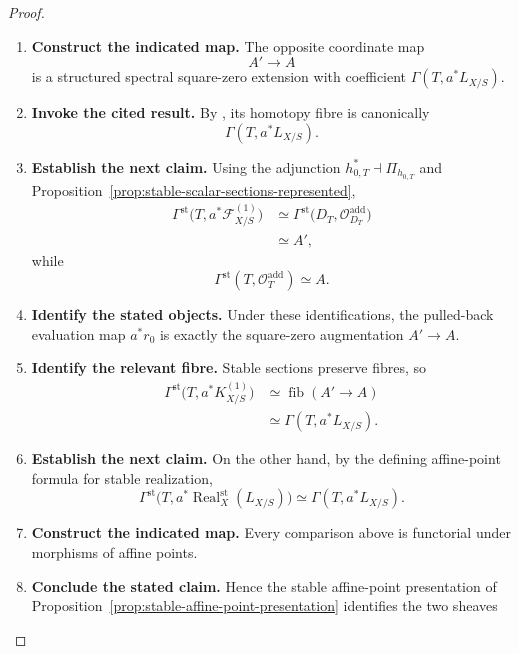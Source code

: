 \begin{proof}
\begin{enumerate}[label=\textup{(\arabic*)}]
     makes \(D_T\) affine.
    Write
    \[
    T=\Spec A,
    \qquad
    D_T=\Spec A'.
    \]
    \item \textbf{Construct the indicated map.}
    The opposite coordinate map
    \[
    A'\longrightarrow A
    \]
    is a structured spectral square-zero extension with coefficient
    \(\Gamma(T,a^*L_{X/S})\).
    \item \textbf{Invoke the cited result.}
    By
    , its homotopy fibre is canonically
    \[
    \Gamma(T,a^*L_{X/S}).
    \]
    \item \textbf{Establish the next claim.}
    Using the adjunction \(h_{0,T}^*\dashv\Pi_{h_{0,T}}\) and
    Proposition~\ref{prop:stable-scalar-sections-represented},
    \[
    \begin{aligned}
    \Gamma^{\mathrm{st}}
    \bigl(T,a^*\mathscr F^{(1)}_{X/S}\bigr)
    &\simeq
    \Gamma^{\mathrm{st}}
    \bigl(D_T,\mathcal O_{D_T}^{\mathrm{add}}\bigr)\\
    &\simeq A',
    \end{aligned}
    \]
    while
    \[
    \Gamma^{\mathrm{st}}(T,\mathcal O_T^{\mathrm{add}})
    \simeq A.
    \]
    \item \textbf{Identify the stated objects.}
    Under these identifications, the pulled-back evaluation map \(a^*r_0\) is exactly
    the square-zero augmentation \(A'\to A\).
    \item \textbf{Identify the relevant fibre.}
    Stable sections preserve fibres, so
    \[
    \begin{aligned}
    \Gamma^{\mathrm{st}}
    \bigl(T,a^*K^{(1)}_{X/S}\bigr)
    &\simeq
    \operatorname{fib}(A'\to A)\\
    &\simeq
    \Gamma(T,a^*L_{X/S}).
    \end{aligned}
    \]
    \item \textbf{Establish the next claim.}
    On the other hand, by the defining affine-point formula for stable realization,
    \[
    \Gamma^{\mathrm{st}}
    \bigl(T,a^*\operatorname{Real}^{\mathrm{st}}_X(L_{X/S})\bigr)
    \simeq
    \Gamma(T,a^*L_{X/S}).
    \]
    \item \textbf{Construct the indicated map.}
    Every comparison above is functorial under morphisms of affine points.
    \item \textbf{Conclude the stated claim.}
    Hence the
    stable affine-point presentation of
    Proposition~\ref{prop:stable-affine-point-presentation} identifies the two sheaves

\end{enumerate}
\end{proof}
